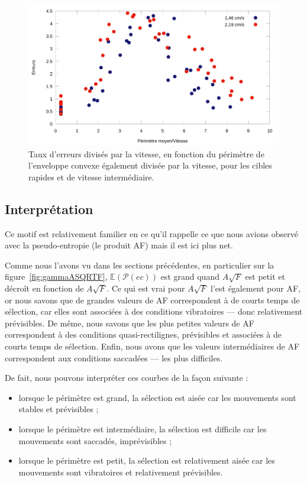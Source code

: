 	\begin{figure}[!htb]
		\centering
		\includegraphics[width=\textwidth]{figures/ch4/errorsVareaEverythingNormed}
		\caption[Taux d'erreurs/V en fonction de $\mathbb{E}(\mathcal{P}(ec))/V$]{Taux d'erreurs divisés par la vitesse, en fonction du périmètre de l'enveloppe convexe également divisée par la vitesse, pour les cibles rapides et de vitesse intermédiaire.}
		\label{fig:errorsVareaEverythingNormed}
	\end{figure}

	
	\subsection{Interprétation}
	Ce motif est relativement familier en ce qu'il rappelle ce que nous avions observé avec la pseudo-entropie (le produit AF) mais il est ici plus net.
	
	Comme nous l'avons vu dans les sections précédentes, en particulier sur la figure~\ref{fig:gammaASQRTF}, $\mathbb{E}(\mathcal{P}(ec))$ est grand quand $A\sqrt{F}$ est petit et décroît en fonction de $A\sqrt{F}$. Ce qui est vrai pour $A\sqrt{F}$ l'est également pour AF, or nous savons que de grandes valeurs de AF correspondent à de courts temps de sélection, car elles sont associées à des conditions vibratoires --- donc relativement prévisibles. De même, nous savons que les plus petites valeurs de AF correspondent à des conditions quasi-rectilignes, prévisibles et associées à de courts temps de sélection. Enfin, nous avons que les valeurs intermédiaires de AF correspondent aux conditions saccadées --- les plus difficiles.
	
	De fait, nous pouvons interpréter ces courbes de la façon suivante :
	\begin{itemize}
		\item lorsque le périmètre est grand, la sélection est aisée car les mouvements sont stables et prévisibles ;
		\item lorsque le périmètre est intermédiaire, la sélection est difficile car les mouvements sont saccadés, imprévisibles ;
		\item lorsque le périmètre est petit, la sélection est relativement aisée car les mouvements sont vibratoires et relativement prévisibles.
	\end{itemize}
	

